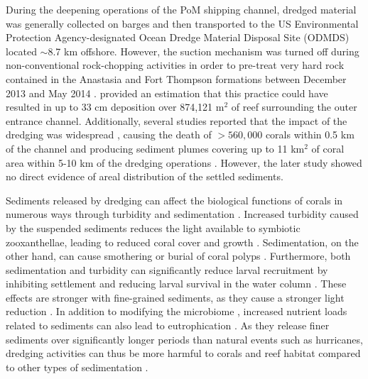 \documentclass[preprint,12pt,authoryear]{elsarticle}
\begin{document}
During the deepening operations of the PoM shipping channel, dredged material was generally collected on barges and then transported to the US Environmental Protection Agency-designated Ocean Dredge Material Disposal Site (ODMDS) located $\sim$8.7 km offshore. However, the suction mechanism was turned off during non-conventional rock-chopping activities in order to pre-treat very hard rock contained in the Anastasia and Fort Thompson formations between December 2013 and May 2014 \citep{miller2016detecting}. \cite{usace2017} provided an estimation that this practice could have resulted in up to 33 cm deposition over 874,121 m$^2$ of reef surrounding the outer entrance channel. Additionally, several studies reported that the impact of the dredging was widespread \citep{miller2016detecting}, causing the death of  $> 560,000$ corals within 0.5 km of the channel \citep{cunning2019extensive} and producing sediment plumes covering up to 11 km$^2$ of coral area within 5-10 km of the dredging operations \citep{barnes2015sediment}. However, the later study showed no direct evidence of areal distribution of the settled sediments.

Sediments released by dredging can affect the biological functions of corals in numerous ways  through turbidity and sedimentation \citep{erftemeijer2012environmental,jones2015effects}. Increased turbidity caused by the suspended sediments reduces the light available to symbiotic zooxanthellae, leading to reduced coral cover and growth \citep{kendall1983effects,rogers1990responses,anthony1999tank,hennige2008photoacclimation}. Sedimentation, on the other hand, can cause smothering or burial of coral polyps \citep{erftemeijer2012environmental,jones2015effects,jones2019sediment}. Furthermore, both sedimentation and turbidity can significantly reduce larval recruitment by inhibiting settlement and reducing larval survival in the water column \citep{jones2015effects}. These effects are stronger with fine-grained sediments, as they cause a stronger light reduction \citep{storlazzi2015influence,fourney2017additive}. In addition to modifying the microbiome \citep{rosales2019oceanographic}, increased nutrient loads related to sediments can also lead to eutrophication \citep{wittenberg1992effects}.
As they release finer sediments over significantly longer periods than natural events such as hurricanes, dredging activities can thus be more harmful to corals and reef habitat compared to other types of sedimentation \citep{cunning2019extensive}.
\end{document}
